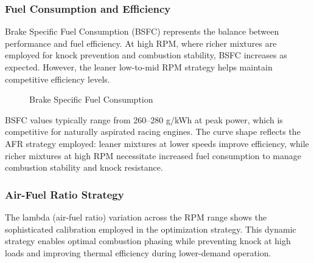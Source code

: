 \subsubsection{Fuel Consumption and Efficiency}

Brake Specific Fuel Consumption (BSFC) represents the balance between performance and fuel efficiency. At high RPM, where richer mixtures are employed for knock prevention and combustion stability, BSFC increases as expected. However, the leaner low-to-mid RPM strategy helps maintain competitive efficiency levels.

\begin{figure}[H]
    \centering
    \begin{minipage}{\textwidth}
        \centering
        \caption{Brake Specific Fuel Consumption}
        \label{fig:task2_bsfc_detail}
    \end{minipage}
\end{figure}

BSFC values typically range from 260--280 g/kWh at peak power, which is competitive for naturally aspirated racing engines. The curve shape reflects the AFR strategy employed: leaner mixtures at lower speeds improve efficiency, while richer mixtures at high RPM necessitate increased fuel consumption to manage combustion stability and knock resistance.

\subsubsection{Air-Fuel Ratio Strategy}

The lambda (air-fuel ratio) variation across the RPM range shows the sophisticated calibration employed in the optimization strategy. This dynamic strategy enables optimal combustion phasing while preventing knock at high loads and improving thermal efficiency during lower-demand operation.

